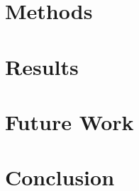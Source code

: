 \documentclass[11pt,letterpaper]{article}
\begin{document}
\section{Methods}

\section{Results}

\section{Future Work}

\section{Conclusion}




\end{document}

